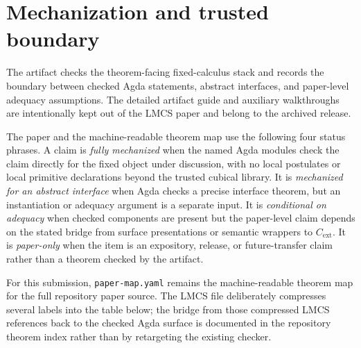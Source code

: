 \documentclass{lmcs}
\begin{document}
\section{Mechanization and trusted boundary}
\label{sec:mechanization}

The artifact checks the theorem-facing fixed-calculus stack and records the
boundary between checked Agda statements, abstract interfaces, and paper-level
adequacy assumptions.  The detailed artifact guide and auxiliary walkthroughs
are intentionally kept out of the LMCS paper and belong to the archived release.

The paper and the machine-readable theorem map use the following four status
phrases.  A claim is \emph{fully mechanized} when the named Agda modules check
the claim directly for the fixed object under discussion, with no local
postulates or local primitive declarations beyond the trusted cubical library.
It is \emph{mechanized for an abstract interface} when Agda checks a precise
interface theorem, but an instantiation or adequacy argument is a separate
input.  It is \emph{conditional on adequacy} when checked components are present
but the paper-level claim depends on the stated bridge from surface
presentations or semantic wrappers to \(C_{\mathrm{ext}}\).  It is
\emph{paper-only} when the item is an expository, release, or future-transfer
claim rather than a theorem checked by the artifact.

For this submission, \texttt{paper-map.yaml} remains the machine-readable theorem map for the
full repository paper source.  The LMCS file deliberately compresses several labels into the
table below; the bridge from those compressed LMCS references back to the checked Agda surface
is documented in the repository theorem index rather than by retargeting the existing checker.
\end{document}

